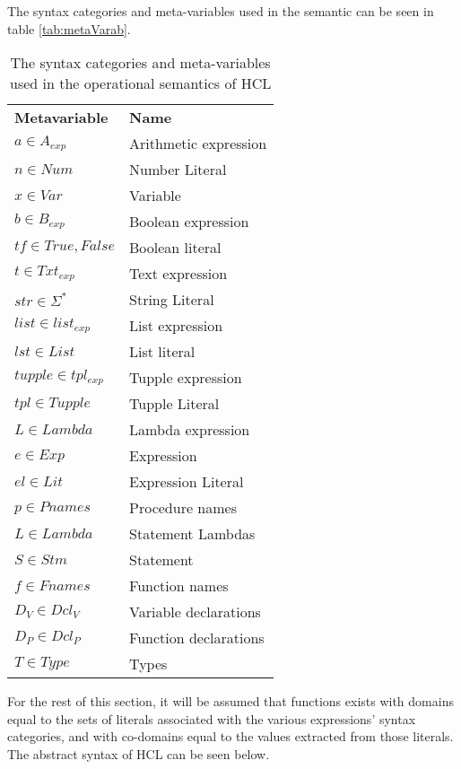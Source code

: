 {The syntax categories and meta-variables used in the semantic can be seen in table \ref{tab:metaVarab}. 
\begin{center}
	\begin{table}[ht]
		\centering
		\caption{The syntax categories and meta-variables used in the operational semantics of HCL}
		\label{tab:metaVar}
		\begin{tabular}{ll}
			\textbf{Metavariable} & \textbf{Name} \\
			$a \in A_{exp}$ 	  & Arithmetic expression \\
			$n \in Num$			  & Number Literal \\
			$x \in Var$           & Variable \\
			$b \in B_{exp}$		  & Boolean expression\\ 
			$tf \in {True,False}$ & Boolean literal \\
			$t \in Txt_{exp}$     & Text expression\\
			$str \in {\Sigma^*}$  & String Literal \\
			$list \in list_{exp}$ & List expression \\
			$lst \in List$		  & List literal\\
			$tupple \in tpl_{exp}$& Tupple expression\\
			$tpl \in Tupple$	  & Tupple Literal\\
			$L \in Lambda$		  & Lambda expression\\
			$e \in Exp$			  & Expression\\
			$el \in Lit$		  & Expression Literal\\
			$p \in Pnames$        & Procedure names\\
			$L \in Lambda$        & Statement Lambdas\\
			$S \in Stm$           & Statement\\
			$f \in Fnames$ 		  & Function names\\
			$D_V \in Dcl_V$		  & Variable declarations\\
			$D_P \in Dcl_P$       & Function declarations\\
			$T \in Type$          & Types
		\end{tabular}
	\end{table}
\end{center}

For the rest of this section, it will be assumed that functions exists with domains equal to the sets of literals associated with the various expressions' syntax categories, and with co-domains equal to the values extracted from those literals.
The abstract syntax of HCL can be seen below.

}
